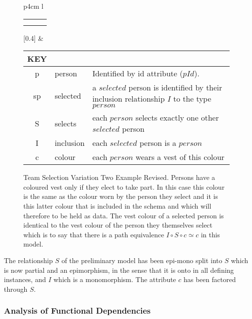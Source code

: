 \begin{figure} [h]
\begin{center}
\begin{tabular}{p{4cm}  l }
\begin{tabular}{c p{1.5cm} c}
   \Rnode{sp}{\rnode{sps}{s}\rnode{spp}{p}} & &    \\[1.4cm]
   \Rnode{p}{p}   & & \Rnode{v}{v}
\end{tabular}
\idcomp
{}
[0.4]
\idcomp &\footnotesize
\begin{tabular}{c p{1.5cm} p{4cm}}
KEY && \\
\hline
p & person & Identified by id attribute ($pId$). \\
sp & selected & a $selected$ person is identified by their inclusion relationship $I$ to the type $person$ \\
S & selects & each $person$ selects exactly one other $selected$ person \\
I & inclusion & each $selected$ person is a $person$ \\
c & colour & each $person$ wears a vest of this colour 
\end{tabular} 
\end{tabular}
\end{center}
\caption{Team Selection Variation Two Example Revised. 
Persons have a coloured vest only if they elect to take part.
In this case this colour is the same as the colour 
worn by the person they select and it is this latter colour that is included in the schema and which will therefore to be held as data. The  vest colour  of a selected person is 
identical to the vest colour of the person they themselves select which is to say that there is a  path equivalence $I \circ S \circ c \simeq c$ in this model.
}
\label{teamselectionvariationtworevisedERschema}
\end{figure}

\begin{categoricalaside}

The relationship $S$ of the preliminary model has been epi-mono split into $S$ which is now partial and an epimorphism, in the sense that it is onto in all defining instances,
and $I$ which is a monomorphism. The attribute $c$ has been factored through $S$.
\end{categoricalaside}

\subsubsection{Analysis of Functional Dependencies}
 



